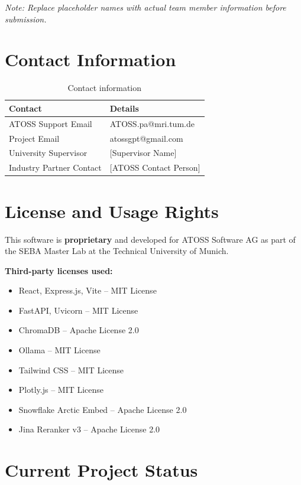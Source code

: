 \documentclass[a4paper,12pt]{report}
\begin{document}
\textit{Note: Replace placeholder names with actual team member information before submission.}

\section{Contact Information}

\begin{table}[H]
\centering
\begin{tabularx}{\textwidth}{lX}
    \toprule
    \textbf{Contact} & \textbf{Details} \\
    \midrule
    ATOSS Support Email & ATOSS.pa@mri.tum.de \\
    Project Email & atossgpt@gmail.com \\
    University Supervisor & {[Supervisor Name]} \\
    Industry Partner Contact & {[ATOSS Contact Person]} \\
    \bottomrule
\end{tabularx}
\caption{Contact information}
\end{table}

\section{License and Usage Rights}

This software is \textbf{proprietary} and developed for ATOSS Software AG as part of the SEBA Master Lab at the Technical University of Munich.

\textbf{Third-party licenses used:}
\begin{itemize}
    \item React, Express.js, Vite -- MIT License
    \item FastAPI, Uvicorn -- MIT License
    \item ChromaDB -- Apache License 2.0
    \item Ollama -- MIT License
    \item Tailwind CSS -- MIT License
    \item Plotly.js -- MIT License
    \item Snowflake Arctic Embed -- Apache License 2.0
    \item Jina Reranker v3 -- Apache License 2.0
\end{itemize}

\section{Current Project Status}
\end{document}
